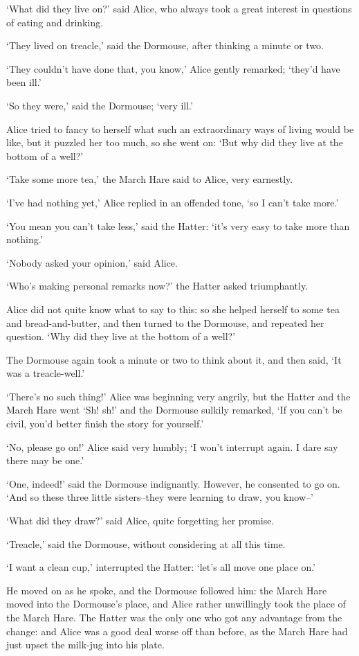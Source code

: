 \documentclass[statementpaper,twoside,openany]{memoir}
\begin{document}
`What did they live on?' said Alice, who always took a great interest in questions of eating and drinking.

`They lived on treacle,' said the Dormouse, after thinking a minute or two.

`They couldn't have done that, you know,' Alice gently remarked; `they'd have been ill.'

`So they were,' said the Dormouse; `very ill.'

Alice tried to fancy to herself what such an extraordinary ways of living would be like, but it puzzled her too much, so she went on: `But why did they live at the bottom of a well?'

`Take some more tea,' the March Hare said to Alice, very earnestly.

`I've had nothing yet,' Alice replied in an offended tone, `so I can't take more.'

`You mean you can't take less,' said the Hatter: `it's very easy to take more than nothing.'

`Nobody asked your opinion,' said Alice.

`Who's making personal remarks now?' the Hatter asked triumphantly.

Alice did not quite know what to say to this: so she helped herself to some tea and bread-and-butter, and then turned to the Dormouse, and repeated her question. `Why did they live at the bottom of a well?'

The Dormouse again took a minute or two to think about it, and then said, `It was a treacle-well.'

`There's no such thing!' Alice was beginning very angrily, but the Hatter and the March Hare went `Sh! sh!' and the Dormouse sulkily remarked, `If you can't be civil, you'd better finish the story for yourself.'

`No, please go on!' Alice said very humbly; `I won't interrupt again. I dare say there may be one.'

`One, indeed!' said the Dormouse indignantly. However, he consented to go on. `And so these three little sisters--they were learning to draw, you know--'

`What did they draw?' said Alice, quite forgetting her promise.

`Treacle,' said the Dormouse, without considering at all this time.

`I want a clean cup,' interrupted the Hatter: `let's all move one place on.'

He moved on as he spoke, and the Dormouse followed him: the March Hare moved into the Dormouse's place, and Alice rather unwillingly took the place of the March Hare. The Hatter was the only one who got any advantage from the change: and Alice was a good deal worse off than before, as the March Hare had just upset the milk-jug into his plate.
\end{document}
